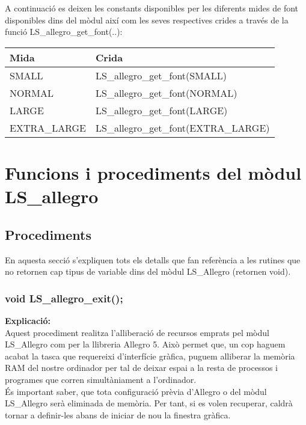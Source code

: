 \documentclass[11pt]{article}
\begin{document}
\noindent A continuació es deixen les constants disponibles per les diferents mides de font disponibles dins del mòdul així com les seves respectives crides a través de la funció LS\_allegro\_get\_font(..):
\begin{center}
	\begin{tabular}{|l|l|}
		\hline
		Mida & Crida\\
		\hline
		SMALL & LS\_allegro\_get\_font(SMALL) \\
		\hline	
		NORMAL & LS\_allegro\_get\_font(NORMAL) \\
		\hline	
		LARGE & LS\_allegro\_get\_font(LARGE) \\
		\hline
		EXTRA\_LARGE & LS\_allegro\_get\_font(EXTRA\_LARGE) \\
		\hline
	\end{tabular}
\end{center}

\section{Funcions i procediments del mòdul LS\_allegro}

\subsection{Procediments}
En aquesta secció s'expliquen tots els detalls que fan referència a les rutines que no retornen cap tipus de variable dins del mòdul LS\_Allegro (retornen void).

\subsubsection{void LS\_allegro\_exit();}

\textbf{Explicació:}\\
Aquest procediment realitza l'alliberació de recursos emprats pel mòdul LS\_Allegro com per la llibreria Allegro 5. Això permet que, un cop haguem acabat la tasca que requereixi d'interfície gràfica, puguem alliberar la memòria RAM del nostre ordinador per tal de deixar espai a la resta de processos i programes que corren simultàniament a l'ordinador.\\

\noindent És important saber, que tota configuració prèvia d'Allegro o del mòdul LS\_Allegro serà eliminada de memòria. Per tant, si es volen recuperar, caldrà tornar a definir-les abans de iniciar de nou la finestra gràfica.\\
\end{document}
